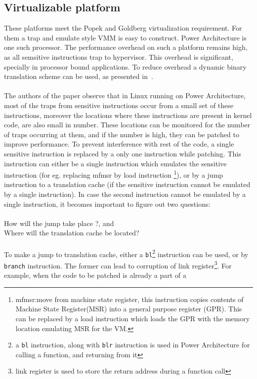\documentclass[a4paper,10pt]{article}
\begin{document}
  \subsection{ Virtualizable platform }
  These platforms meet the Popek and Goldberg virtualization requirement. For them a trap and emulate style VMM is easy to construct.
  Power Architecture is one such processor. The performance overhead on such a platform remains high, as all semsitive instructions trap to hypervisor.
  This overhead is significant, specially in processor bound applications. To reduce overhead a dynamic binary translation scheme can be used, as presented in~\cite{Mittal:2013:EVE:2499368.2451163}.
  \\\\
  The authors of the paper observe that in Linux running on Power Architecture, most of the traps from sensitive instructions occur from a small set of these instructions, moreover 
  the locations where these instructions are present in kernel code, are also small in number. These locations can be monitored for the number of traps occurring at them,
  and if the number is high, they can be patched to improve performance. To prevent interference  with rest of the code, a single sensitive instruction is
  replaced by a only one instruction while patching. This instruction can either be a single instruction which emulates the sensitive instruction
  (for eg. replacing mfmsr by load instruction \footnote{mfmsr:move from machine state register, this instruction 
  copies contents of Machine State Register(MSR) into a general purpose register (GPR). This can be replaced by a load instruction which loads 
  the GPR with the memory location emulating MSR for the VM.}), or by a jump instruction to a translation cache (if the sensitive instruction cannot be emulated by a single instruction).
  In case the second instruction cannot be emulated by a single instruction, it becomes important to figure out two questions: 
  \\\\How will the jump take place ?, and
  \\
  Where will the translation cache be located?\\\\
  To make a jump to translation cache, either a \texttt{bl}\footnote{a \texttt{bl} instruction, along with \texttt{blr} instruction is used in Power Architecture for calling a function, and returning from it } instruction can be used, or by \texttt{branch}
  instruction. The former can lead to corruption of link register\footnote{link register is used to store the return address during a function call}. For example, when the code to be patched is already a part of a
\end{document}
